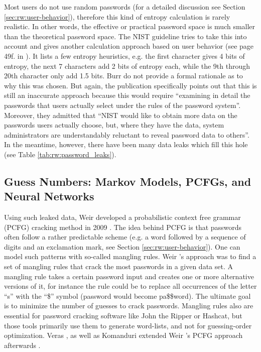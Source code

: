 	Most users do not use random passwords (for a detailed discussion see Section \ref{sec:rw:user-behavior}), therefore this kind of entropy calculation is rarely realistic. In other words, the effective or practical password space is much smaller than the theoretical password space. The \gls{NIST} guideline tries to take this into account and gives another calculation approach based on user behavior (see page 49f. in \cite{Burr2004NISTEntropy}). It lists a few entropy heuristics, e.g. the first character gives 4 bits of entropy, the next 7 characters add 2 bits of entropy each, while the 9th through 20th character only add 1.5 bits. Burr \etal do not provide a formal rationale as to why this was chosen. But again, the publication specifically points out that this is still an inaccurate approach because this would require ``examining in detail the passwords that users actually select under the rules of the password system''. Moreover, they admitted that ``NIST would like to obtain more data on the passwords users actually choose, but, where	they have the data, system administrators are understandably reluctant to reveal password	data to others''. In the meantime, however, there have been many data leaks which fill this hole (see Table \ref{tab:rw:password_leaks}).
	
	\subsection{Guess Numbers: Markov Models, PCFGs, and Neural Networks}
	
	Using such leaked data, Weir \etal developed a probabilistic context free grammar (PCFG) cracking method in 2009 \cite{Weir2009PCFG}. The idea behind PCFG is that passwords often follow a rather predictable scheme (e.g. a word followed by a sequence of digits and an exclamation mark, see Section \ref{sec:rw:user-behavior}). One can model such patterns with so-called mangling rules. Weir \etal's approach was to find a set of mangling rules that crack the most passwords in a given data set. A mangling rule takes a certain password input and creates one or more alternative versions of it, for instance the rule could be to replace all occurrences of the letter ``s'' with the ``\$'' symbol (password would become pa\$\$word). The ultimate goal is to minimize the number of guesses to crack passwords. Mangling rules also are essential for password cracking software like John the Ripper or Hashcat, but those tools primarily use them to generate word-lists, and not for guessing-order optimization. Veras \etal \cite{Veras2014SemanticPatterns}, as well as Komanduri extended Weir \etal's PCFG approach afterwards \cite{Komanduri2016Dissertation}.

